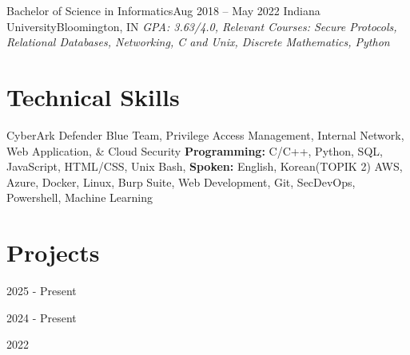 \documentclass{resume}
\begin{document}
  \resumeEntryStart
    \resumeEntryTSDL
    {Bachelor of Science in Informatics}{Aug 2018 -- May 2022}
    {Indiana University}{Bloomington, IN}
      {\newline{}\newline{}\scriptsize \textit{ \footnotesize{GPA: 3.63/4.0, Relevant Courses: Secure Protocols, Relational Databases, Networking, C and Unix, Discrete Mathematics, Python}}}
  \resumeEntryEnd

\section{Technical Skills}
 \resumeTechnicalEntryStart
   {CyberArk Defender}
   {Blue Team, Privilege Access Management, Internal Network, Web Application, \& Cloud Security}
   {\textbf{Programming:} C/C++, Python, SQL, JavaScript, HTML/CSS, Unix Bash, \textbf{Spoken:} English, Korean(TOPIK 2)}
   {AWS, Azure, Docker, Linux, Burp Suite, Web Development, Git, SecDevOps, Powershell, Machine Learning}
  \resumeTechnicalEntryEnd

\section{Projects}
  \resumeProjectEntryStart
    \resumeEntryTD
      {\passmeter}{2025 - Present}
    \resumeItemListStart
    \resumeItemListEnd
  \resumeProjectEntryEnd 
  
  \resumeProjectEntryStart
    \resumeEntryTD
      {\potionprogramming}{2024 - Present}
    \resumeItemListStart
    \resumeItemListEnd
  \resumeProjectEntryEnd

  \resumeProjectEntryStart
    \resumeEntryTD
      {\rowhammerattackresearch}{2022}
    \resumeItemListStart  
    \resumeItemListEnd  
  \resumeProjectEntryEnd  
\end{document}
